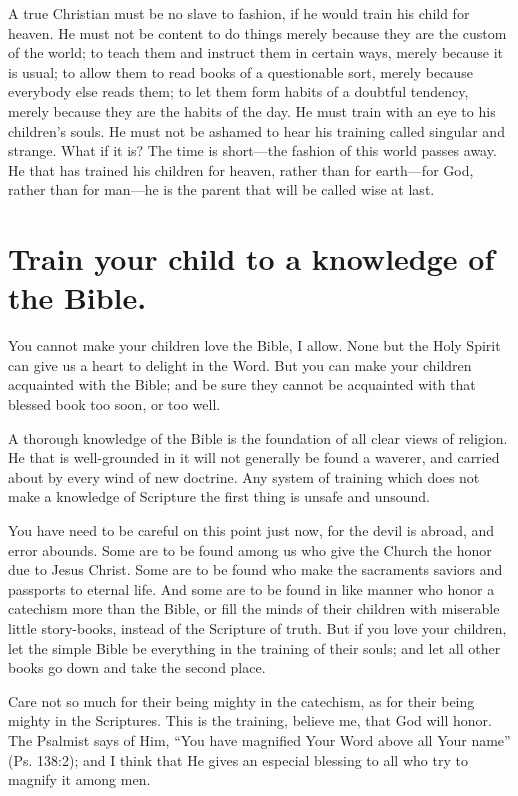 \documentclass[
]{book}
\begin{document}
A true Christian must be no slave to fashion, if he would train his child for heaven. He must not be content to do things merely because they are the custom of the world; to teach them and instruct them in certain ways, merely because it is usual; to allow them to read books of a questionable sort, merely because everybody else reads them; to let them form habits of a doubtful tendency, merely because they are the habits of the day. He must train with an eye to his children's souls. He must not be ashamed to hear his training called singular and strange. What if it is? The time is short---the fashion of this world passes away. He that has trained his children for heaven, rather than for earth---for God, rather than for man---he is the parent that will be called wise at last.

\hypertarget{train-your-child-to-a-knowledge-of-the-bible.}{%
\chapter{Train your child to a knowledge of the Bible.}\label{train-your-child-to-a-knowledge-of-the-bible.}}

You cannot make your children love the Bible, I allow. None but the Holy Spirit can give us a heart to delight in the Word. But you can make your children acquainted with the Bible; and be sure they cannot be acquainted with that blessed book too soon, or too well.

A thorough knowledge of the Bible is the foundation of all clear views of religion. He that is well-grounded in it will not generally be found a waverer, and carried about by every wind of new doctrine. Any system of training which does not make a knowledge of Scripture the first thing is unsafe and unsound.

You have need to be careful on this point just now, for the devil is abroad, and error abounds. Some are to be found among us who give the Church the honor due to Jesus Christ. Some are to be found who make the sacraments saviors and passports to eternal life. And some are to be found in like manner who honor a catechism more than the Bible, or fill the minds of their children with miserable little story-books, instead of the Scripture of truth. But if you love your children, let the simple Bible be everything in the training of their souls; and let all other books go down and take the second place.

Care not so much for their being mighty in the catechism, as for their being mighty in the Scriptures. This is the training, believe me, that God will honor. The Psalmist says of Him, ``You have magnified Your Word above all Your name'' (Ps. 138:2); and I think that He gives an especial blessing to all who try to magnify it among men.
\end{document}
